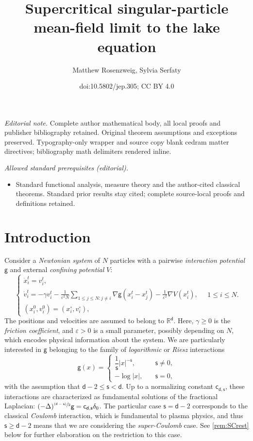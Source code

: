 \documentclass[10pt]{amsart}
\title{Supercritical singular-particle mean-field limit to the lake equation}
\author{Matthew Rosenzweig, Sylvia Serfaty}
\date{doi:10.5802/jep.305; CC BY 4.0}
\newcommand{\psfrac}[2]{\sfrac{(#1)}{#2}}
\theoremstyle{plain}
\theoremstyle{definition}
\newcommand{\R}{{\mathbb{R}}}
\let\ga\gamma
\let\vep\varepsilon
\renewcommand{\d}{\mathsf{d}}
\newcommand{\g}{{\mathsf{g}}}
\newcommand{\s}{\mathsf{s}}
\newcommand{\cd}{\mathsf{c}_{\mathsf{d},\mathsf{s}}}
\begin{document}
\maketitle
\noindent\textit{Editorial note.} Complete author mathematical body, all local proofs and publisher bibliography retained. Original theorem assumptions and exceptions preserved. Typography-only wrapper and source copy blank cedram matter directives; bibliography math delimiters rendered inline.\par\medskip
\noindent\textit{Allowed standard prerequisites (editorial).}\begin{itemize}
\item Standard functional analysis, measure theory and the author-cited classical theorems. Standard prior results stay cited; complete source-local proofs and definitions retained.
\end{itemize}\medskip
\vspace*{-\baselineskip}
\tableofcontents


\section{Introduction}\label{sec:intro}
Consider a \emph{Newtonian system} of $N$ particles with a pairwise \emph{interaction potential} $\g$ and external \emph{confining potential} $V$:
\begin{equation}\label{eq:NewODE}
\begin{cases}
\dot{x}_i^t = v_i^t, \\
\dot{v}_i^t = -\ga v_i^t \displaystyle-\frac{1}{\vep^2 N} \sum_{1\leq j\leq N: j\neq i}\nabla\g(x_i^t-x_j^t) -\frac{1}{\vep^2}\nabla V(x_i^t),\\
(x_i^0,v_i^0) = (x_i^\circ,v_i^\circ),
\end{cases}
\quad 1\le i\le N.
\end{equation}
The positions and velocities are assumed to belong to $\R^\d$. Here, $\ga\geq 0$ is the \emph{friction coefficient}, and $\vep>0$ is a small parameter, possibly depending on $N$, which encodes physical information about the system. We are particularly interested in $\g$ belonging to the family of \emph{logarithmic} or \emph{Riesz} interactions
\begin{equation}\label{eq:gmod}
\g(x)= \begin{cases} \dfrac{1}{\s} |x|^{-\s}, \quad & \s \neq 0,\\
-\log |x|, \quad & \s=0,
\end{cases}
\end{equation}
with the assumption that $\d-2\le \s<\d$. Up to a normalizing constant $\cd$, these interactions are characterized as fundamental solutions of the fractional Laplacian: $(-\Delta)^{\psfrac{\d-\s}{2}}\g = \cd \delta_0$. The particular case $\s=\d-2$ corresponds to the classical \emph{Coulomb} interaction, which is fundamental to plasma physics, and thus $\s \ge \d-2$ means that we are considering the \emph{super-Coulomb} case. See \cref{rem:SCrest} below for further elaboration on the restriction to this case.
\end{document}
